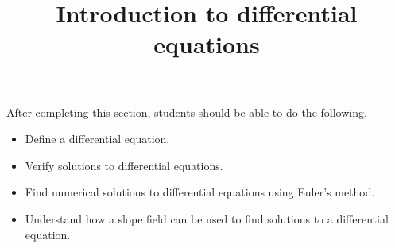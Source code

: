 \documentclass{ximera}
\title{Introduction to differential equations}
\begin{document}
\begin{abstract}
\end{abstract}

\maketitle

\begin{sectionOutcomes}

After completing this section, students should be able to do the following.

\begin{itemize}
	\item Define a differential equation.
	\item Verify solutions to differential equations.
	\item Find numerical solutions to differential equations using Euler's method.
	\item Understand how a slope field can be used to find solutions to a differential equation.
\end{itemize}

\end{sectionOutcomes}
\end{document}
